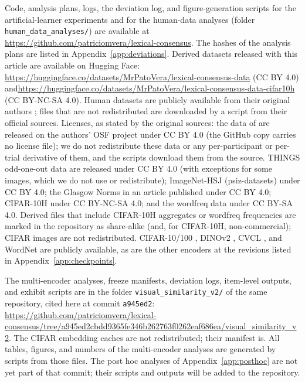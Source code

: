 \documentclass[11pt]{article}
\begin{document}
Code, analysis plans, logs, the deviation log, and figure-generation scripts for the artificial-learner experiments and for the human-data analyses (folder \texttt{human\_data\_analyses/}) are available at \url{https://github.com/patriciomvera/lexical-consensus}. The hashes of the analysis plans are listed in Appendix~\ref{app:deviations}. Derived datasets released with this article are available on Hugging Face: \url{https://huggingface.co/datasets/MrPatoVera/lexical-consensus-data} (CC BY 4.0) and\newline \url{https://huggingface.co/datasets/MrPatoVera/lexical-consensus-data-cifar10h} (CC BY-NC-SA 4.0). Human datasets are publicly available from their original authors \parencite{lewis2018,hebart2023,roads2021,peterson2019,scott2019}; files that are not redistributed are downloaded by a script from their official sources. Licenses, as stated by the original sources: the data of \textcite{lewis2018} are released on the authors' OSF project under CC BY 4.0 (the GitHub copy carries no license file); we do not redistribute these data or any per-participant or per-trial derivative of them, and the scripts download them from the source. THINGS odd-one-out data are released under CC BY 4.0 (with exceptions for some images, which we do not use or redistribute); ImageNet-HSJ (psiz-datasets) under CC BY 4.0; the Glasgow Norms in an article published under CC BY 4.0; CIFAR-10H under CC BY-NC-SA 4.0; and the wordfreq data under CC BY-SA 4.0. Derived files that include CIFAR-10H aggregates or wordfreq frequencies are marked in the repository as share-alike (and, for CIFAR-10H, non-commercial); CIFAR images are not redistributed. CIFAR-10/100 \parencite{krizhevsky2009}, DINOv2 \parencite{oquab2023}, CVCL \parencite{vong2024}, and WordNet \parencite{miller1995} are publicly available, as are the other encoders at the revisions listed in Appendix~\ref{app:checkpoints}.

The multi-encoder analyses, freeze manifests, deviation logs, item-level outputs, and exhibit scripts are in the folder \texttt{visual\_similarity\_v2/} of the same repository, cited here at commit \texttt{a945ed2}: \url{https://github.com/patriciomvera/lexical-consensus/tree/a945ed2cbdd9365fe346b262763f0262eaf686ea/visual_similarity_v2}. The CIFAR embedding caches are not redistributed; their manifest is. All tables, figures, and numbers of the multi-encoder analyses are generated by scripts from those files. The post hoc analyses of Appendix~\ref{app:posthoc} are not yet part of that commit; their scripts and outputs will be added to the repository.
\end{document}
